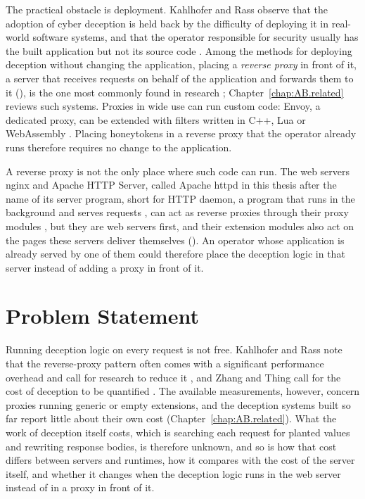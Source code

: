 \documentclass{rptuma}
\begin{document}
The practical obstacle is deployment. Kahlhofer and Rass observe that the adoption of cyber
deception is held back by the difficulty of deploying it in real-world software systems, and that
the operator responsible for security usually has the built application but not its source code
\cite{kahlhofer2024application}. Among the methods for deploying deception without changing the
application, placing a \emph{reverse proxy} in front of it, a server that receives requests on
behalf of the application and forwards them to it (), is the one most
commonly found in research \cite{kahlhofer2024application}; Chapter~\ref{chap:AB.related} reviews
such systems. Proxies in wide use can run custom code: Envoy, a dedicated proxy, can be extended
with filters written in C++, Lua or WebAssembly \cite{envoy_what,zhu2023dissecting}. Placing
honeytokens in a reverse proxy that the operator already runs therefore requires no change to the
application.

A reverse proxy is not the only place where such code can run. The web servers nginx and Apache HTTP
Server, called Apache httpd in this thesis after the name of its server program, short for HTTP
daemon, a program that runs in the background and serves requests
\cite{apache_httpd_program}, can act as reverse proxies through their proxy modules
\cite{nginx_proxy,apache_modproxy}, but they are web servers first, and their extension modules
also act on the pages these servers deliver themselves \cite{luanginx,apache_modlua}
(). An operator whose application is already served by one of them
could therefore place the deception logic in that server instead of adding a proxy in front of it.

\section{Problem Statement}
\label{sec:intro.problem}

Running deception logic on every request is not free. Kahlhofer and Rass note that the
reverse-proxy pattern often comes with a significant performance overhead and call for research to
reduce it \cite{kahlhofer2024application}, and Zhang and Thing call for the cost of deception to be
quantified \cite{zhang2021three}. The available measurements, however, concern proxies running
generic or empty extensions, and the deception systems built so far report little about their own
cost (Chapter~\ref{chap:AB.related}). What the work of deception itself costs, which is searching
each request for planted values and rewriting response bodies, is therefore unknown, and so is how
that cost differs between servers and runtimes, how it compares with the cost of the server itself,
and whether it changes when the deception logic runs in the web server instead of in a proxy in
front of it.
\end{document}
